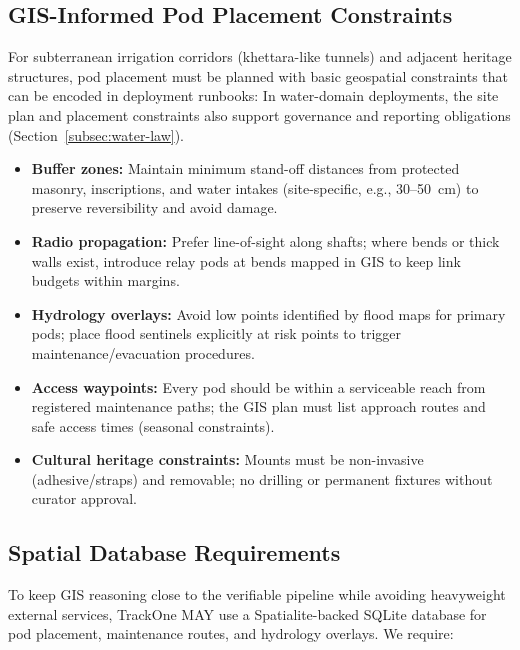 \subsection{GIS-Informed Pod Placement Constraints}\label{subsec:gis-informed-pod-placement-constraints}
For subterranean irrigation corridors (khettara-like tunnels) and adjacent heritage structures, pod placement must be planned with basic geospatial constraints that can be encoded in deployment runbooks:
In water-domain deployments, the site plan and placement constraints also support governance and reporting obligations (Section~\ref{subsec:water-law}).
\begin{itemize}[nosep]
  \item \textbf{Buffer zones:} Maintain minimum stand-off distances from protected masonry, inscriptions, and water intakes (site-specific, e.g., 30--50~cm) to preserve reversibility and avoid damage.
  \item \textbf{Radio propagation:} Prefer line-of-sight along shafts; where bends or thick walls exist, introduce relay pods at bends mapped in \ac{GIS} to keep link budgets within margins.
  \item \textbf{Hydrology overlays:} Avoid low points identified by flood maps for primary pods; place flood sentinels explicitly at risk points to trigger maintenance/evacuation procedures.
  \item \textbf{Access waypoints:} Every pod should be within a serviceable reach from registered maintenance paths; the \ac{GIS} plan must list approach routes and safe access times (seasonal constraints).
  \item \textbf{Cultural heritage constraints:} Mounts must be non-invasive (adhesive/straps) and removable; no drilling or permanent fixtures without curator approval.
\end{itemize}

\subsection{Spatial Database Requirements}\label{subsec:spatial-database-requirements}
To keep \ac{GIS} reasoning close to the verifiable pipeline while avoiding heavyweight external services, TrackOne MAY use a
Spatialite-backed SQLite database for pod placement, maintenance routes, and hydrology overlays.
We require:


